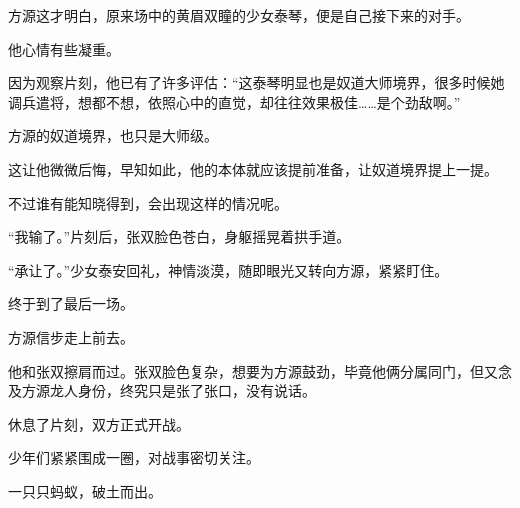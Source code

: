 \begin{this_body}
方源这才明白，原来场中的黄眉双瞳的少女泰琴，便是自己接下来的对手。

他心情有些凝重。

因为观察片刻，他已有了许多评估：“这泰琴明显也是奴道大师境界，很多时候她调兵遣将，想都不想，依照心中的直觉，却往往效果极佳……是个劲敌啊。”

方源的奴道境界，也只是大师级。

这让他微微后悔，早知如此，他的本体就应该提前准备，让奴道境界提上一提。

不过谁有能知晓得到，会出现这样的情况呢。

“我输了。”片刻后，张双脸色苍白，身躯摇晃着拱手道。

“承让了。”少女泰安回礼，神情淡漠，随即眼光又转向方源，紧紧盯住。

终于到了最后一场。

方源信步走上前去。

他和张双擦肩而过。张双脸色复杂，想要为方源鼓劲，毕竟他俩分属同门，但又念及方源龙人身份，终究只是张了张口，没有说话。

休息了片刻，双方正式开战。

少年们紧紧围成一圈，对战事密切关注。

一只只蚂蚁，破土而出。

\end{this_body}

